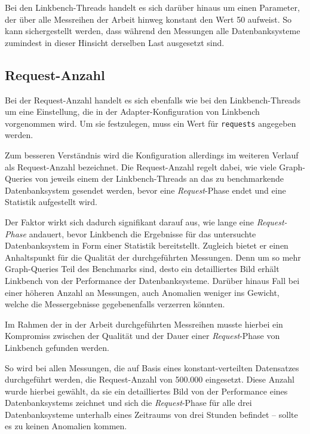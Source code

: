 Bei den Linkbench-Threads handelt es sich darüber hinaus um einen Parameter, der über alle Messreihen der Arbeit hinweg konstant den Wert 50 aufweist. So kann sichergestellt werden, dass während den Messungen alle Datenbanksysteme zumindest in dieser Hinsicht derselben Last ausgesetzt sind. 

\subsection{Request-Anzahl}
\label{Request-Anzahl}
Bei der Request-Anzahl handelt es sich ebenfalls wie bei den Linkbench-Threads um eine Einstellung, die in der Adapter-Konfiguration von Linkbench vorgenommen wird. Um sie festzulegen, muss ein Wert für \texttt{requests} angegeben werden. 

Zum besseren Verständnis wird die Konfiguration allerdings im weiteren Verlauf als Request-Anzahl bezeichnet. Die Request-Anzahl regelt dabei, wie viele Graph-Queries von jeweils einem der Linkbench-Threads an das zu benchmarkende Datenbanksystem gesendet werden, bevor eine \textit{Request}-Phase endet und eine Statistik aufgestellt wird. 

Der Faktor wirkt sich dadurch signifikant darauf aus, wie lange eine \textit{Request-Phase} andauert, bevor Linkbench die Ergebnisse für das untersuchte Datenbanksystem in Form einer Statistik bereitstellt. Zugleich bietet er einen Anhaltspunkt für die Qualität der durchgeführten Messungen. Denn um so mehr Graph-Queries Teil des Benchmarks sind, desto ein detailliertes Bild erhält Linkbench von der Performance der Datenbanksysteme. Darüber hinaus Fall bei einer höheren Anzahl an Messungen, auch Anomalien weniger ins Gewicht, welche die Messergebnisse gegebenenfalls verzerren könnten.

Im Rahmen der in der Arbeit durchgeführten Messreihen musste hierbei ein Kompromiss zwischen der Qualität und der Dauer einer \textit{Request}-Phase von Linkbench gefunden werden. 

So wird bei allen Messungen, die auf Basis eines konstant-verteilten Datensatzes durchgeführt werden, die Request-Anzahl von 500.000 eingesetzt. Diese Anzahl wurde hierbei gewählt, da sie ein detailliertes Bild von der Performance eines Datenbanksystems zeichnet und sich die \textit{Request}-Phase für alle drei Datenbanksysteme unterhalb eines Zeitraums von drei Stunden befindet -- sollte es zu keinen Anomalien kommen. 

